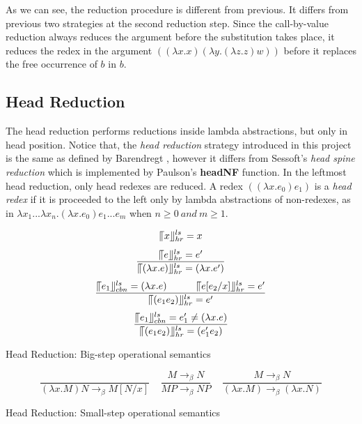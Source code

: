 As we can see, the reduction procedure is different from previous. It differs from previous two strategies at the second reduction step. Since the call-by-value reduction always reduces the argument before the substitution takes place, it reduces the redex in the argument $((\lambda x.x)(\lambda y.(\lambda z.z)w))$ before it replaces the free occurrence of $b$ in $b$.


\subsection{Head Reduction}

The head reduction performs reductions inside lambda abstractions, but only in head position. Notice that, the \textit{head reduction} strategy introduced in this project is the same as defined by Barendregt \cite{barendregt1984lambda}, however it differs from Sessoft's \cite{sestoft2002demonstrating} \textit{head spine reduction} which is implemented by Paulson's \textbf{headNF} function\cite{paulson1996ml}. In the leftmost head reduction, only head redexes are reduced. A redex $((\lambda x.e_0)e_1)$ is a \textit{head redex} if it is proceeded to the left only by lambda abstractions of non-redexes, as in $\lambda x_1...\lambda x_n.(\lambda x.e_0)e_1...e_m$ when $n \geqslant 0\ and\ m \geqslant 1$.


\begin{equation*}
\llceil x \rrfloor ^{ls} _{hr} = x
\end{equation*}
\begin{equation*}
\frac{\llceil e \rrfloor ^{ls} _{hr} = e'}{\llceil (\lambda x.e) \rrfloor ^{ls} _{hr} = (\lambda x.e')}
\end{equation*}
\begin{equation*}
\frac{\llceil e_1 \rrfloor ^{ls} _{cbn} = (\lambda x.e)\ \ \ \ \ \ \ \ \ \llceil e[e_2/x] \rrfloor ^{ls} _{hr} = e'}{\llceil (e_1e_2) \rrfloor ^{ls} _{hr} = e'}
\end{equation*}
\begin{equation*}
\frac{\llceil e_1 \rrfloor ^{ls} _{cbn} = e'_1\neq (\lambda x.e)}{\llceil (e_1e_2) \rrfloor ^{ls} _{hr}  = (e'_1e_2)}
\end{equation*}
\begin{center}
Head Reduction: Big-step operational semantics
\end{center}


\begin{equation*}
\frac{}{(\lambda x.M)N \rightarrow _\beta M[N/x]}\ \ \ \ \  
\frac{M \rightarrow _\beta N}{MP \rightarrow _\beta NP}\ \ \ \ \ 
\frac{M \rightarrow _\beta N}{(\lambda x.M) \rightarrow _\beta (\lambda x.N)}
\end{equation*}
\begin{center}
Head Reduction: Small-step operational semantics
\end{center}

